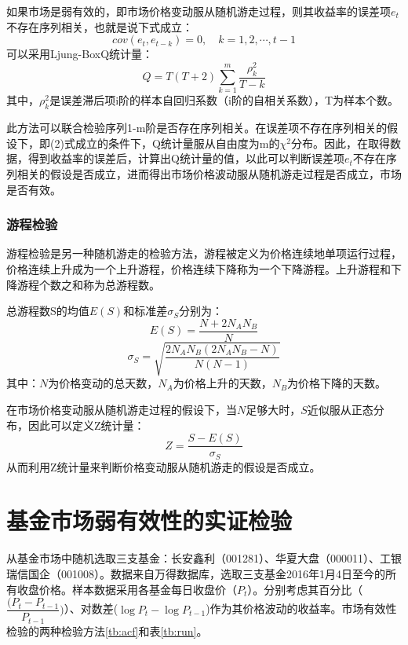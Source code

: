 \documentclass[11pt]{article}
\begin{document}
如果市场是弱有效的，即市场价格变动服从随机游走过程，则其收益率的误差项$e_t$不存在序列相关，也就是说下式成立：
\begin{equation}
cov(e_t,e_{t-k})=0,\quad k=1,2,\cdots ,t-1
\end{equation}
可以采用Ljung-Box\quad Q统计量：
\begin{equation}
Q=T(T+2)\sum_{k=1}^{m}\frac{\rho_k^2}{T-k}
\end{equation}
其中，$\rho_k^2$是误差滞后项i阶的样本自回归系数（i阶的自相关系数），T为样本个数。

此方法可以联合检验序列1-m阶是否存在序列相关。在误差项不存在序列相关的假设下，即(2)式成立的条件下，Q统计量服从自由度为m的$\chi^2$分布。因此，在取得数据，得到收益率的误差后，计算出Q统计量的值，以此可以判断误差项$e_t$不存在序列相关的假设是否成立，进而得出市场价格波动服从随机游走过程是否成立，市场是否有效。

\subsubsection{游程检验}
游程检验是另一种随机游走的检验方法，游程被定义为价格连续地单项运行过程，价格连续上升成为一个上升游程，价格连续下降称为一个下降游程。上升游程和下降游程个数之和称为总游程数。

总游程数S的均值$E(S)$和标准差$\sigma_S$分别为：
\begin{equation}
E(S)=\frac{N+2N_AN_B}{N}
\end{equation}
\begin{equation}
\sigma_S=\sqrt{\frac{2N_AN_B(2N_AN_B-N)}{N(N-1)}}
\end{equation}
其中：$N$为价格变动的总天数，$N_A$为价格上升的天数，$N_B$为价格下降的天数。

在市场价格变动服从随机游走过程的假设下，当$N$足够大时，$S$近似服从正态分布，因此可以定义Z统计量：
\begin{equation}
Z=\frac{S-E(S)}{\sigma_S}
\end{equation}
从而利用Z统计量来判断价格变动服从随机游走的假设是否成立。

\section{基金市场弱有效性的实证检验}

从基金市场中随机选取三支基金：长安鑫利（001281）、华夏大盘（000011）、工银瑞信国企（001008）。数据来自万得数据库，选取三支基金2016年1月4日至今的所有收盘价格。样本数据采用各基金每日收盘价（$P_t$）。分别考虑其百分比（$\dfrac{(P_t-P_{t-1}}{P_{t-1}})$）、对数差($\log P_t-\log P_{t-1}$)作为其价格波动的收益率。市场有效性检验的两种检验方法\ref{tb:acf}和表\ref{tb:run}。
\end{document}
